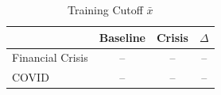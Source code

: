 \begin{table}[htbp]
  \centering
  \caption{Training Cutoff $\bar{x}$}
  \label{tab:xbar}
  \begin{tabular}{lccc}
    \toprule
    & Baseline & Crisis & $\Delta$ \\
    \midrule
    Financial Crisis & -- & -- & -- \\
    COVID & -- & -- & -- \\
    \bottomrule
  \end{tabular}
\end{table}